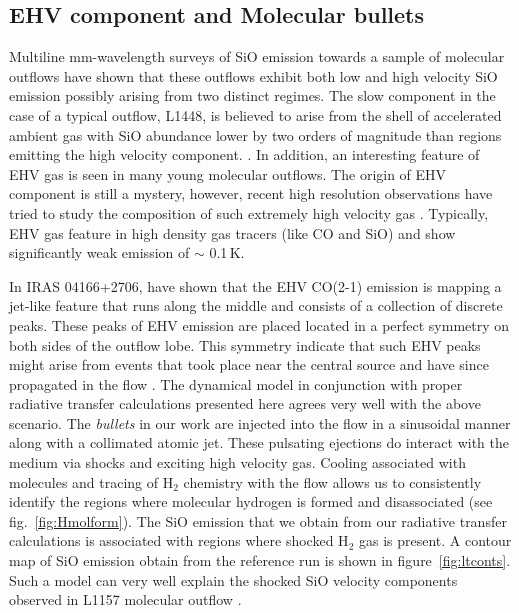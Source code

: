 \documentclass[useAMS,usenatbib]{mn2e}
\begin{document}
\subsection{EHV component and Molecular bullets}
\label{ssec:EHV}
Multiline mm-wavelength surveys of SiO emission towards a sample of molecular
outflows have shown that these outflows exhibit both low and high
velocity SiO emission possibly arising from two distinct regimes. The slow
component in the case of a typical outflow, L1448, is believed to arise from
the shell of accelerated ambient gas with SiO abundance
lower by two orders of magnitude than regions emitting the high velocity component.
\cite{Codella:1999p12584}. In addition, an interesting feature of EHV
gas is seen in many young molecular outflows. The origin of EHV
component is still a mystery, however, recent high resolution
observations have tried to study the composition of such extremely high
velocity gas \cite{Tafalla:2010p14759}. Typically, EHV gas feature in
high density gas tracers (like CO and SiO) 
and show significantly weak emission of $\sim$ 0.1\,K.
%

In IRAS 04166+2706, \cite{SantiagoGarcia:2009p13972} have shown 
that the EHV CO(2-1) emission is mapping a jet-like
feature that runs along the middle and consists of a collection of
discrete peaks. These peaks of EHV emission are placed located in a
perfect symmetry on both sides of the outflow lobe. This symmetry
indicate that such EHV peaks might arise from events that took place
near the central source and have since propagated in the flow
\cite{Bachiller:1990p11196, Tafalla:2011p14051}. The dynamical 
model in conjunction with proper radiative transfer calculations presented here 
agrees very well with the above scenario. The {\em{bullets}} in our
work are injected into the flow in a sinusoidal manner along with a
collimated atomic jet. These pulsating ejections do interact with the medium
via shocks and exciting high velocity gas. Cooling associated with
molecules and tracing of H$_{2}$ chemistry with the flow allows us to
consistently identify the regions where molecular hydrogen is formed
and disassociated (see fig.~\ref{fig:Hmolform}). The SiO emission that we
obtain from our radiative transfer calculations is associated with
regions where shocked H$_{2}$ gas is present. A contour map of SiO
emission obtain from the reference run is shown in
figure~\ref{fig:ltconts}. Such a model can very well explain the
shocked SiO velocity components observed in L1157 molecular outflow \cite{Gueth:1998p14058}. 
%
 
\end{document}
